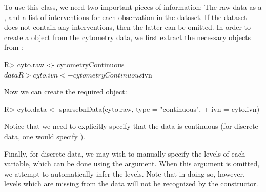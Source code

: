 \documentclass[article]{jss}
\renewcommand{\|}{\,|\,}
\begin{document}
To use this class, we need two important pieces of information: The raw data as a , and a list of interventions for each observation in the dataset. If the dataset does not contain any interventions, then the latter can be omitted. In order to create a  object from the cytometry data, we first extract the necessary objects from :
%
\begin{CodeChunk}
\begin{CodeInput}
R> cyto.raw <- cytometryContinuous$data
R> cyto.ivn <- cytometryContinuous$ivn
\end{CodeInput}
\end{CodeChunk}
%
Now we can create the required  object:
%
\begin{CodeChunk}
\begin{CodeInput}
R> cyto.data <- sparsebnData(cyto.raw, type = "continuous", 
+    ivn = cyto.ivn)
\end{CodeInput}
\end{CodeChunk}
%
Notice that we need to explicitly specify that the data is continuous (for discrete data, one would specify ). 

Finally, for discrete data, we may wish to manually specify the levels of each variable, which can be done using the  argument. When this argument is omitted, we attempt to automatically infer the levels. Note that in doing so, however, levels which are missing from the data will not be recognized by the  constructor.
\end{document}
